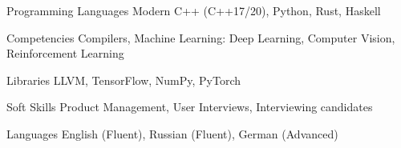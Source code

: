 
\begin{cvskills}

  \cvskill
    {Programming Languages}
    {Modern C++ (C++17/20), Python, Rust, Haskell}

  \cvskill
    {Competencies}
    {Compilers, Machine Learning: Deep Learning, Computer Vision, Reinforcement
     Learning}

  \cvskill
    {Libraries}
    {LLVM, TensorFlow, NumPy, PyTorch}

  \cvskill
    {Soft Skills}
    {Product Management, User Interviews, Interviewing candidates}

  \cvskill
    {Languages}
    {English (Fluent), Russian (Fluent), German (Advanced)}

\end{cvskills}
